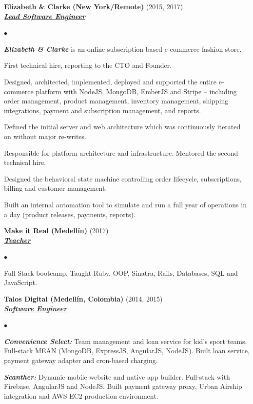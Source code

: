 \documentclass[a4paper]{article}
\newcommand{\employer}[3]{{
  \textbf{#1} (#2)\\ \underline{\textbf{\emph{#3}}}\\ }}
\newenvironment{achievements}{\begin{list}{$\bullet$}{\topsep 0pt \itemsep
  -2pt}}{\vspace*{4pt}\end{list}}
\newcommand{\emphasys}[1]{\textbf{\emph{#1}}}
\begin{document}
  \newpage

  \employer{ Elizabeth \& Clarke (New York/Remote)}{2015, 2017}{Lead Software Engineer}
  \begin{achievements}
  \item \emphasys{Elizabeth \& Clarke} is an online subscription-based e-commerce fashion store.
  \item First technical hire, reporting to the CTO and Founder.
  \item Designed, architected, implemented, deployed and supported the entire e-commerce platform with NodeJS, MongoDB, EmberJS and Stripe -- including order management, product management, inventory management, shipping integrations, payment and subscription management, and reports.
  \item Defined the initial server and web architecture which was continuously iterated on without major re-writes.
  \item Responsible for platform architecture and infrastructure. Mentored the second technical hire.
  \item Designed the behavioral state machine controlling order lifecycle, subscriptions, billing and customer management.
  \item Built an internal automation tool to simulate and run a full year of operations in a day (product releases, payments, reports).
  \end{achievements}

  \employer{Make it Real (Medell\'in)}{2017}{Teacher}
  \begin{achievements}
  \item Full-Stack bootcamp. Taught Ruby, OOP, Sinatra, Rails, Databases, SQL and JavaScript.
  \end{achievements}

  \employer{ Talos Digital (Medell\'in, Colombia)}{2014, 2015}{Software Engineer}
  \begin{achievements}
  \item \emphasys{Convenience Select:} Team management and loan service for kid's sport teams. Full-stack MEAN (MongoDB, ExpressJS, AngularJS, NodeJS). Built loan service, payment gateway adapter and cron-based charging.
  \item \emphasys{Scanther:} Dynamic mobile website and native app builder. Full-stack with Firebase, AngularJS and NodeJS. Built payment gateway proxy, Urban Airship integration and AWS EC2 production environment.
  \end{achievements}
\end{document}
